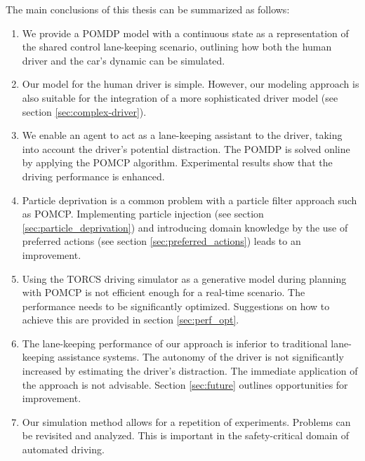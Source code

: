 \vspace{1em}
\noindent
The main conclusions of this thesis can be summarized as follows:
\begin{enumerate}
    \item We provide a POMDP model with a continuous state as a representation of the shared control lane-keeping scenario, outlining how both the human driver and the car's dynamic can be simulated. 
    \item Our model for the human driver is simple. However, our modeling approach is also suitable for the integration of a more sophisticated driver model (see section \ref{sec:complex-driver}).
    \item We enable an agent to act as a lane-keeping assistant to the driver, taking into account the driver's potential distraction. The POMDP is solved online by applying the POMCP algorithm. Experimental results show that the driving performance is enhanced.
    \item Particle deprivation is a common problem with a particle filter approach such as POMCP. Implementing particle injection (see section \ref{sec:particle_deprivation}) and introducing domain knowledge by the use of preferred actions (see section \ref{sec:preferred_actions}) leads to an improvement.
    \item Using the TORCS driving simulator as a generative model during planning with POMCP is not efficient enough for a real-time scenario. The performance needs to be significantly optimized. Suggestions on how to achieve this are provided in section \ref{sec:perf_opt}.
    \item The lane-keeping performance of our approach is inferior to traditional lane-keeping assistance systems. The autonomy of the driver is not significantly increased by estimating the driver's distraction. The immediate application of the approach is not advisable. Section \ref{sec:future} outlines opportunities for improvement.
    \item Our simulation method allows for a repetition of experiments. Problems can be revisited and analyzed. This is important in the safety-critical domain of automated driving.
\end{enumerate}




